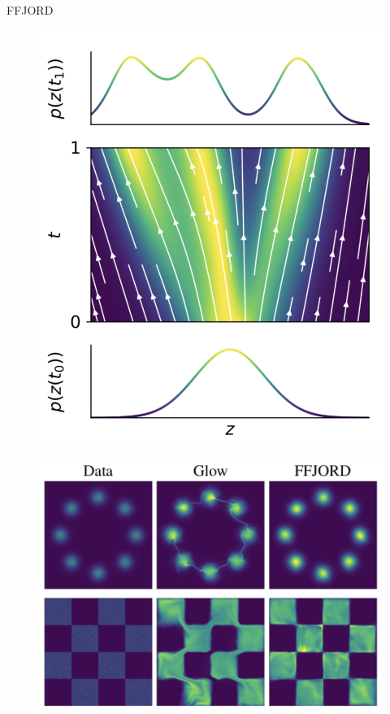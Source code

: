 \begin{frame}{FFJORD}
	\vspace{-0.4cm}
	\begin{minipage}[t]{0.4\columnwidth}
		\begin{figure}
			\centering
			\includegraphics[width=0.8\linewidth]{figs/cnf_flow.png}
		\end{figure}
	\end{minipage}%
	\begin{minipage}[t]{0.6\columnwidth}
		\begin{figure}
		   \centering
		   \includegraphics[width=0.85\linewidth]{figs/ffjord.png}
		\end{figure}

\end{minipage}
\end{frame}
